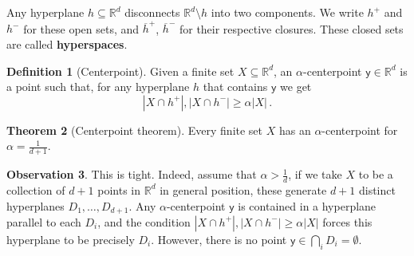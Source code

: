 \documentclass[12pt]{amsart}
\theoremstyle{definition}
\newtheorem{thm}{Theorem}[section]
\newtheorem{obs}[thm]{Observation}
\newtheorem{defin}[thm]{Definition}
\newcommand{\R}{\mathbb{R}}
\newcommand{\vy}{\mathsf{y}}
\begin{document}
Any hyperplane $h \subseteq \R^d$ disconnects $\R^d \setminus h$ into two components.
We write $h^+$ and $h^-$ for these open sets, and $\overline{h}^+$, $\overline{h}^-$ for their respective closures.
These closed sets are called \textbf{hyperspaces}.

\begin{defin}[Centerpoint]
Given a finite set $X \subseteq \R^d$, an $\alpha$-centerpoint $\vy \in \R^d$ is a point such that, for any hyperplane $h$ that contains $\vy$ we get
$$ |X \cap h^+|, |X\cap h^-| \geq \alpha |X| \, . $$
\end{defin}

\begin{thm}[Centerpoint theorem]\label{thm:centerpoint}
Every finite set $X$ has an $\alpha$-centerpoint for $\alpha = \frac{1}{d+1}$.
\end{thm}

\begin{obs}
This is tight.
Indeed, assume that $\alpha > \frac{1}{d}$, if we take $X$ to be a collection of $d+1$ points in $\R^d$ in general position, these generate $d+1$ distinct hyperplanes $D_1, \ldots, D_{d+1}$.
Any $\alpha$-centerpoint $\vy$ is contained in a hyperplane parallel to each $D_i$, and the condition $|X \cap h^+|, |X\cap h^-| \geq \alpha |X|$ forces this hyperplane to be precisely $D_i$.
However, there is no point $\vy \in \bigcap_i D_i = \emptyset$.
\end{obs}
\end{document}

